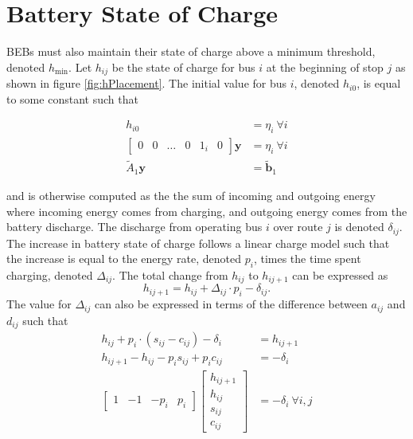 \section{Battery State of Charge\label{sec:5_battery}}
BEBs must also maintain their state of charge above a minimum threshold, denoted $h_{\text{min}}$. Let $h_{ij}$ be the state of charge for bus $i$ at the beginning of stop $j$ as shown in figure \ref{fig:hPlacement}. The initial value for bus $i$, denoted $h_{i0}$, is equal to some constant such that

\begin{equation}\label{eqn:initialSoc0}\begin{aligned}
	h_{i0} &= \eta_{i} \ \forall i \\
	\begin{bmatrix}0 & 0 & \hdots & 0 & 1_i& 0 \end{bmatrix}\mathbf{y} &= \eta_i \ \forall i \\
		\tilde{A}_1\mathbf{y} &= \tilde{\mathbf{b}}_1
\end{aligned} \end{equation}

and is otherwise computed as the the sum of incoming and outgoing energy where incoming energy comes from charging, and outgoing energy comes from the battery discharge. The discharge from operating bus $i$ over route $j$ is denoted $\delta_{ij}$. The increase in battery state of charge follows a linear charge model such that the increase is equal to the energy rate, denoted $p_i$, times the time spent charging, denoted $\Delta_{ij}$\cite{rong_coordinated_2016}.
The total change from $h_{ij}$ to $h_{ij+1}$ can be expressed as
\begin{equation}
	h_{ij+1} = h_{ij} + \Delta_{ij} \cdot p_i - \delta_{ij}.
\end{equation}
The value for $\Delta_{ij}$ can also be expressed in terms of the difference between $a_{ij}$ and $d_{ij}$ such that
\begin{equation}\label{eqn:socDynamic1}\begin{aligned}
	h_{ij} + p_i\cdot \left ( s_{ij} - c_{ij} \right ) - \delta_i &= h_{ij+1}\\
	h_{ij+1} - h_{ij} - p_is_{ij} + p_ic_{ij} &= -\delta_i\\
	\begin{bmatrix} 1 & -1 & -p_i & p_i\end{bmatrix} \begin{bmatrix}h_{ij+1} \\ h_{ij} \\ s_{ij} \\ c_{ij} \end{bmatrix} &= -\delta_i \ \forall i,j
\end{aligned}\end{equation}
